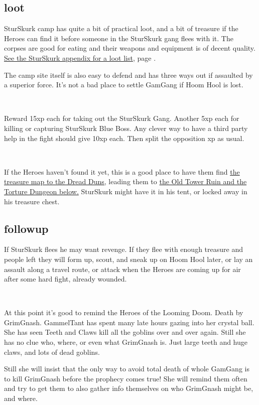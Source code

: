 \subsection*{loot}

SturSkurk camp has quite a bit of practical loot, and a bit of treasure if the Heroes can find it before someone in the SturSkurk gang flees with it. The corpses are good for eating and their weapons and equipment is of decent quality. 
\hyperref[appendixsturskurk]{See the SturSkurk appendix for a loot list}, page \pageref{appendixsturskurk}.


The camp site itself is also easy to defend and has three ways out if assaulted by a superior force. It's not a bad place to settle GamGang if Hoom Hool is lost.

\

Reward 15xp each for taking out the SturSkurk Gang. Another 5xp each for killing or capturing SturSkurk Blue Boss. Any clever way to have a third party help in the fight should give 10xp each. Then split the opposition xp as usual.

\

If the Heroes haven't found it yet, this is a good place to have them find 
\hyperref[appendixtreasuremap]{the treasure map to the Dread Duns,} 
leading them to 
\hyperref[xxtorturedungeon]{the Old Tower Ruin and the Torture Dungeon below.} 
SturSkurk might have it in his tent, or locked away in his treasure chest.


\subsection*{followup}

If SturSkurk flees he may want revenge. If they flee with enough treasure and people left they will form up, scout, and sneak up on Hoom Hool later, or lay an assault along a travel route, or attack when the Heroes are coming up for air after some hard fight, already wounded.

\

At this point it's good to remind the Heroes of the Looming Doom. Death by GrimGnash. GammelTant has spent many late hours gazing into her crystal ball. She has seen Teeth and Claws kill all the goblins over and over again. Still she has no clue who, where, or even what GrimGnash is. Just large teeth and huge claws, and lots of dead goblins. 

Still she will insist that the only way to avoid total death of whole GamGang is to kill GrimGnash before the prophecy comes true! She will remind them often and try to get them to also gather info themselves on who GrimGnash might be, and where.














